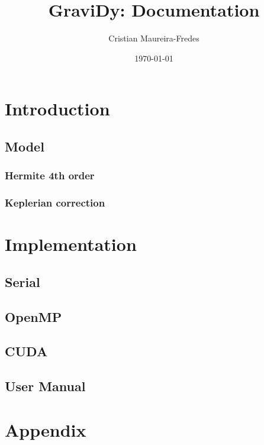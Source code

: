 \documentclass[a4paper]{report}
\title{{\sc GraviDy}: Documentation}
\author{Cristian Maureira-Fredes}
\date{\today}
\begin{document}

\chapter{Introduction}
\section{Model}
\subsection{Hermite 4th order}
\subsection{Keplerian correction}


\chapter{Implementation}
\section{Serial}
\section{OpenMP}
\section{CUDA}

\section{User Manual}

\chapter{Appendix}

\end{document}

